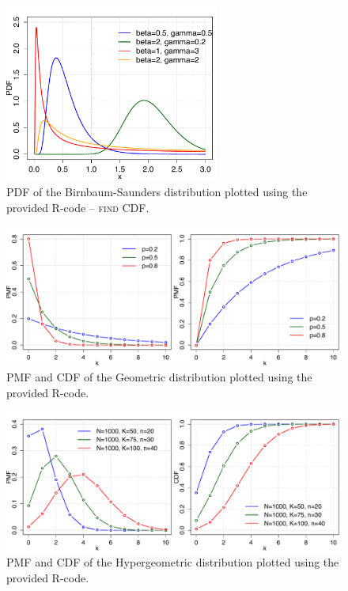 \begin{figure}[htb!]
\centering
  \includegraphics[width=70mm]{pics/BirnbaumSaunders_pdf.pdf}
 \caption{PDF of the Birnbaum-Saunders distribution plotted using the provided R-code -- {\color{red} \scshape{find CDF}}.}
 \label{fig:BirnbaumSaunders_pdf}
\end{figure}

\begin{figure}[htb!]
\centering
  \includegraphics[width=140mm]{pics/Geometric_pmf_cdf.pdf}
 \caption{PMF and CDF of the Geometric distribution plotted using the provided R-code.}
 \label{fig:Geometric_pmf_cdf}
\end{figure}

\begin{figure}[htb!]
\centering
  \includegraphics[width=140mm]{pics/Hypergeometric_pmf_cdf.pdf}
 \caption{PMF and CDF of the Hypergeometric distribution plotted using the provided R-code.}
 \label{fig:Hypergeometric_pmf_cdf}
\end{figure}

